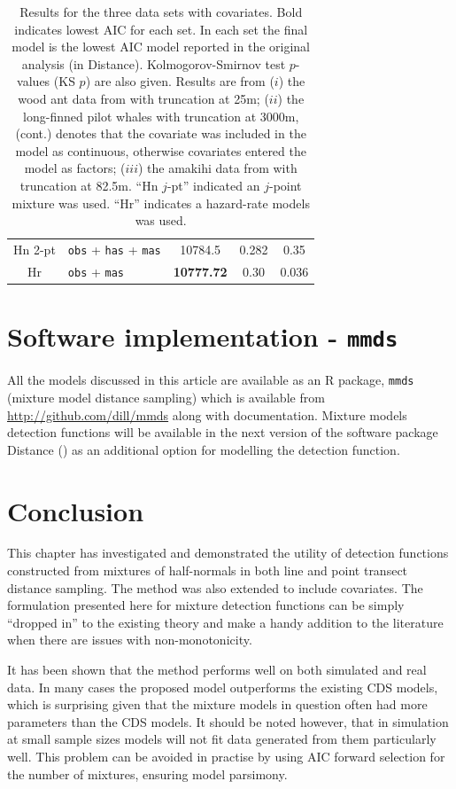 \begin{table}
\begin{tabular}{c l c c c}
Hn 2-pt & \texttt{obs} + \texttt{has} + \texttt{mas} & 10784.5 & 0.282 &  0.35\\
Hr & \texttt{obs} + \texttt{mas} & \textbf{10777.72} & 0.30 & 0.036 \\
\end{tabular}
\caption{Results for the three data sets with covariates. Bold indicates lowest AIC for each set. In each set the final model is the lowest AIC model reported in the original analysis (in Distance). Kolmogorov-Smirnov test $p$-values (KS $p$) are also given. Results are from ($i$) the wood ant data from  with truncation at 25m; ($ii$) the long-finned pilot whales  with truncation at 3000m, (cont.) denotes that the covariate was included in the model as continuous, otherwise covariates entered the model as factors; ($iii$) the amakihi data from  with truncation at 82.5m. ``Hn $j$-pt'' indicated an $j$-point mixture was used. ``Hr'' indicates a hazard-rate models was used.}
\label{big-results-table}
\end{table}


\section{Software implementation - \texttt{mmds}}

All the models discussed in this article are available as an \textsf{R} package, \texttt{mmds} (mixture model distance sampling) which is available from \url{http://github.com/dill/mmds} along with documentation. Mixture models detection functions will be available in the next version of the software package Distance (\cite{distance-software}) as an additional option for modelling the detection function.

\section{Conclusion}
\label{s:discuss}

This chapter has investigated and demonstrated the utility of detection functions constructed from mixtures of half-normals in both line and point transect distance sampling. The method was also extended to include covariates. The formulation presented here for mixture detection functions can be simply ``dropped in'' to the existing theory and make a handy addition to the literature when there are issues with non-monotonicity.

It has been shown that the method performs well on both simulated and real data. In many cases the proposed model outperforms the existing CDS models, which is surprising given that the mixture models in question often had more parameters than the CDS models. It should be noted however, that in simulation at small sample sizes models will not fit data generated from them particularly well. This problem can be avoided in practise by using AIC forward selection for the number of mixtures, ensuring model parsimony.

